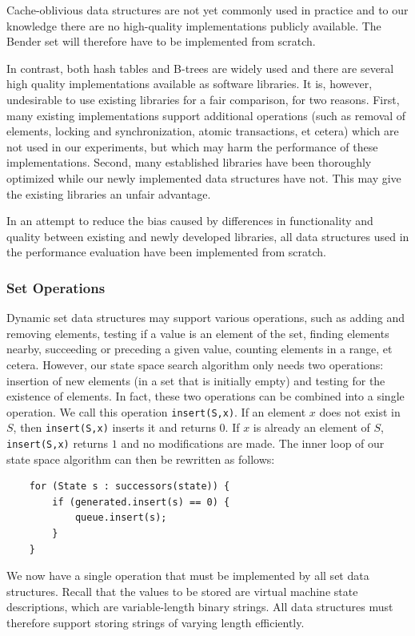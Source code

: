\documentclass{acm_proc_article-sp}
\begin{document}
Cache-oblivious data structures are not yet commonly used in practice and to
our knowledge there are no high-quality implementations publicly available.
The Bender set will therefore have to be implemented from scratch.

In contrast, both hash tables and B-trees are widely used and there are several
high quality implementations available as software libraries. It is, however,
undesirable to use existing libraries for a fair comparison, for two reasons. First, many existing implementations support additional operations (such as removal of elements, locking and synchronization, atomic transactions, et cetera) which are not used in our experiments, but which may harm the performance of these implementations. Second, many established libraries have been thoroughly optimized while our newly implemented data structures have not. This may give the existing libraries an unfair advantage.

In an attempt to reduce the bias caused by differences in functionality and
quality between existing and newly developed libraries, all data structures
used in the performance evaluation have been implemented from scratch.

\subsubsection{Set Operations}
Dynamic set data structures may support various operations, such as adding and removing elements, testing if a value is an element of the set, finding elements nearby, succeeding or preceding a given value, counting elements in a range, et cetera. However, our state space search algorithm only needs two operations: insertion of new elements (in a set that is initially empty) and testing for the existence of elements. In fact, these two operations can be combined into a single operation. We call this operation \verb#insert(S,x)#. If an element $x$ does not exist in $S$, then \verb#insert(S,x)# inserts it and returns $0$. If $x$ is already an element of $S$, \verb#insert(S,x)# returns $1$ and no modifications are made. The inner loop of our state space algorithm can then be rewritten as follows:
\begin{verbatim}
    for (State s : successors(state)) {
        if (generated.insert(s) == 0) {
            queue.insert(s);
        }
    }
\end{verbatim}

We now have a single operation that must be implemented by all set data structures. Recall that the values to be stored are virtual machine state descriptions, which are variable-length binary strings. All data structures must therefore support storing strings of varying length efficiently.
\end{document}
